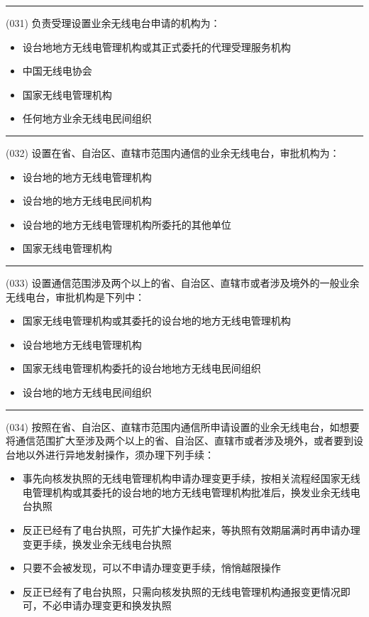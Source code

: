 \documentclass[twocolumn]{ctexart}  %
\begin{document}
\noindent\rule{0.5\textwidth}{1pt}
\heiti (031) 负责受理设置业余无线电台申请的机构为： \songti {\color{gray} [LK0030] }
\begin{itemize}
	\item  设台地地方无线电管理机构或其正式委托的代理受理服务机构
	\item  中国无线电协会
	\item  国家无线电管理机构
	\item  任何地方业余无线电民间组织
\end{itemize}


\noindent\rule{0.5\textwidth}{1pt}
\heiti (032) 设置在省、自治区、直辖市范围内通信的业余无线电台，审批机构为： \songti {\color{gray} [LK0031] }
\begin{itemize}
	\item  设台地的地方无线电管理机构
	\item  设台地的地方无线电民间机构
	\item  设台地的地方无线电管理机构所委托的其他单位
	\item  国家无线电管理机构
\end{itemize}


\noindent\rule{0.5\textwidth}{1pt}
\heiti (033) 设置通信范围涉及两个以上的省、自治区、直辖市或者涉及境外的一般业余无线电台，审批机构是下列中： \songti {\color{gray} [LK0032] }
\begin{itemize}
	\item  国家无线电管理机构或其委托的设台地的地方无线电管理机构
	\item  设台地地方无线电管理机构
	\item  国家无线电管理机构委托的设台地地方无线电民间组织
	\item  设台地的地方无线电民间组织
\end{itemize}


\noindent\rule{0.5\textwidth}{1pt}
\heiti (034) 按照在省、自治区、直辖市范围内通信所申请设置的业余无线电台，如想要将通信范围扩大至涉及两个以上的省、自治区、直辖市或者涉及境外，或者要到设台地以外进行异地发射操作，须办理下列手续： \songti {\color{gray} [LK0033] }
\begin{itemize}
	\item  事先向核发执照的无线电管理机构申请办理变更手续，按相关流程经国家无线电管理机构或其委托的设台地的地方无线电管理机构批准后，换发业余无线电台执照
	\item  反正已经有了电台执照，可先扩大操作起来，等执照有效期届满时再申请办理变更手续，换发业余无线电台执照
	\item  只要不会被发现，可以不申请办理变更手续，悄悄越限操作
	\item  反正已经有了电台执照，只需向核发执照的无线电管理机构通报变更情况即可，不必申请办理变更和换发执照
\end{itemize}
\end{document}
